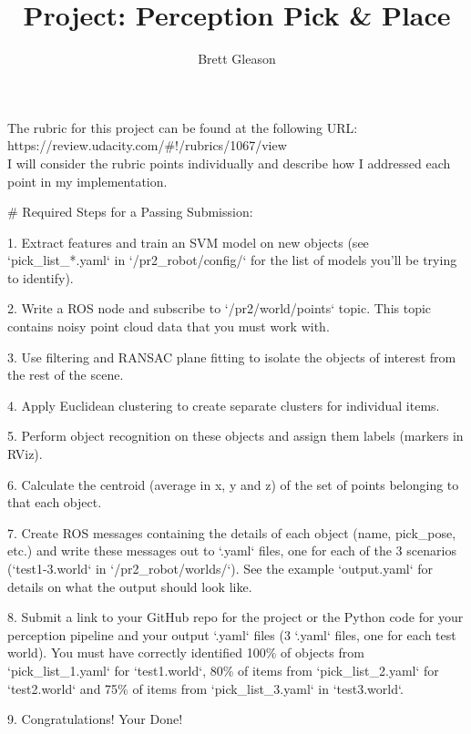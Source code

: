 \documentclass{article}
\begin{document}
\title{Project: Perception Pick \& Place}
\author{Brett Gleason}

\maketitle

The rubric for this project can be found at the following URL: \\
https://review.udacity.com/#!/rubrics/1067/view \\
I will consider the rubric points individually and describe how I addressed each point in my implementation.

# Required Steps for a Passing Submission:

1. Extract features and train an SVM model on new objects (see `pick_list_*.yaml` in `/pr2_robot/config/` for the list of models you'll be trying to identify). 

2. Write a ROS node and subscribe to `/pr2/world/points` topic. This topic contains noisy point cloud data that you must work with.

3. Use filtering and RANSAC plane fitting to isolate the objects of interest from the rest of the scene.

4. Apply Euclidean clustering to create separate clusters for individual items.

5. Perform object recognition on these objects and assign them labels (markers in RViz).

6. Calculate the centroid (average in x, y and z) of the set of points belonging to that each object.

7. Create ROS messages containing the details of each object (name, pick_pose, etc.) and write these messages out to `.yaml` files, one for each of the 3 scenarios (`test1-3.world` in `/pr2_robot/worlds/`).  See the example `output.yaml` for details on what the output should look like.  

8. Submit a link to your GitHub repo for the project or the Python code for your perception pipeline and your output `.yaml` files (3 `.yaml` files, one for each test world).  You must have correctly identified 100\% of objects from `pick_list_1.yaml` for `test1.world`, 80\% of items from `pick_list_2.yaml` for `test2.world` and 75\% of items from `pick_list_3.yaml` in `test3.world`.

9. Congratulations!  Your Done!



\end{document}
